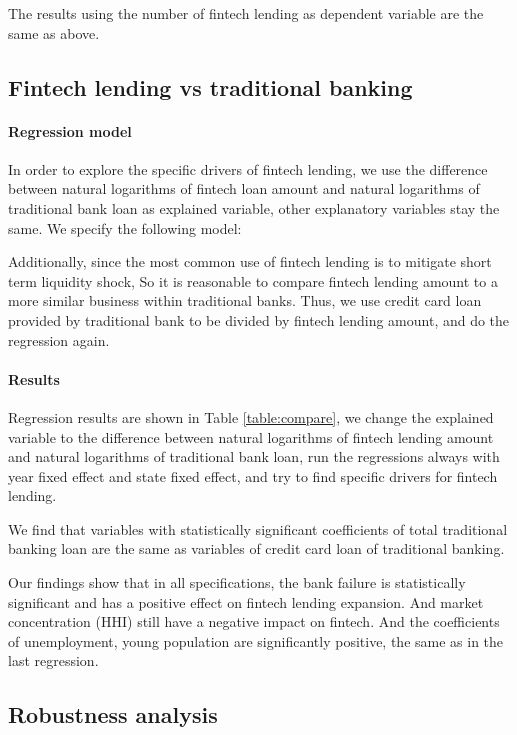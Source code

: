 \documentclass[11pt, a4paper, leqno]{article}
\begin{document}
The results using the number of fintech lending as dependent variable are the same as above. 

\subsection{Fintech lending vs traditional banking}
\paragraph{Regression model} 
In order to explore the specific drivers of fintech lending, we use the difference between natural logarithms of fintech loan amount and natural logarithms of traditional bank loan as explained variable, other explanatory variables stay the same. We specify the following model:


Additionally, since the most common use of fintech lending is to mitigate short term liquidity shock, So it is reasonable to compare fintech lending amount to a more similar business within traditional banks. Thus, we use credit card loan provided by traditional bank to be divided by fintech lending amount, and do the regression again.  

\paragraph{Results}
Regression results are shown in Table \ref{table:compare}, we change the explained variable to the difference between natural logarithms of fintech lending amount and natural logarithms of traditional bank loan, run the regressions always with year fixed effect and state fixed effect, and try to find specific drivers for fintech lending. 

We find that variables with statistically significant coefficients of total traditional banking loan are the same as variables of credit card loan of traditional banking. 

Our findings show that in all specifications, the bank failure is statistically significant and has a positive effect on fintech lending expansion. And market concentration (HHI) still have a negative impact on fintech. And the coefficients of unemployment, young population are significantly positive, the same as in the last regression.


\subsection{Robustness analysis}
\end{document}
